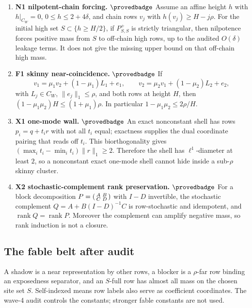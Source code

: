 \begin{enumerate}[leftmargin=*,itemsep=0.5ex]
\item \textbf{N1 nilpotent-chain forcing.} \(\provedbadge\)
Assume an affine height \(h\) with \(h|_{C_W}=0\),
\(0\le h\le 2+4\delta\), and chain rows \(v_j\) with
\(h(v_j)\ge H-j\rho\).  For the initial high set
\(S\subset\{h\ge H/2\}\), if \(P^+_{S,S}\) is strictly triangular, then
nilpotence forces positive mass from \(S\) to off-chain high rows, up to
the audited \(O(\delta)\) leakage terms.  It does not give the missing
upper bound on that off-chain high mass.

\item \textbf{F1 skinny near-coincidence.} \(\provedbadge\)
If
\[
v_1=\mu_1v_2+(1-\mu_1)L_1+e_1,\qquad
v_2=\mu_2v_1+(1-\mu_2)L_2+e_2,
\]
with \(L_j\in C_W\), \(\|e_j\|_1\le\rho\), and both rows at height \(H\),
then
\((1-\mu_1\mu_2)H\le (1+\mu_1)\rho\).  In particular
\(1-\mu_1\mu_2\le 2\rho/H\).

\item \textbf{X1 one-mode wall.} \(\provedbadge\)
An exact nonconstant shell has rows \(p_i=q+t_i r\) with not all \(t_i\) equal;
exactness supplies the dual coordinate pairing that reads off \(t_i\).  This
biorthogonality gives
\((\max_i t_i-\min_i t_i)\|r\|_1\ge 2\).  Therefore the shell has
\(\ell^1\)-diameter at least \(2\), so a nonconstant exact one-mode shell
cannot hide inside a sub-\(\rho\) skinny cluster.

\item \textbf{X2 stochastic-complement rank preservation.} \(\provedbadge\)
For a block decomposition \(P=\begin{psmallmatrix}A&B\\ C&D\end{psmallmatrix}\)
with \(I-D\) invertible, the stochastic complement
\(Q=A+B(I-D)^{-1}C\) is row-stochastic and idempotent, and
\(\operatorname{rank}Q=\operatorname{rank}P\).  Moreover the complement
can amplify negative mass, so rank induction is not a closure.
\end{enumerate}

\subsection{The fable belt after audit}

A shadow is a near representation by other rows, a blocker is a
\(\rho\)-far row binding an exposedness separator, and an \(S\)-full row
has almost all mass on the chosen site set \(S\).  Self-indexed means row
labels also serve as coefficient coordinates.  The wave-4 audit controls
the constants; stronger fable constants are not used.

